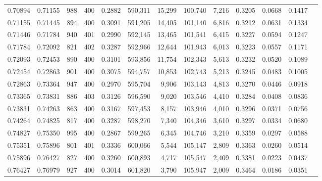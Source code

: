 \begin{tabular}{rrrrrrrrrrrrr}
0.70894 & 0.71155 &   988 & 400 &                                     0.2882 & 590,311 &  15,299 & 100,740 &   7,216 & 0.3205 & 0.0668 & 0.1417 \\
0.71155 & 0.71445 &   894 & 400 &                                     0.3091 & 591,205 &  14,405 & 101,140 &   6,816 & 0.3212 & 0.0631 & 0.1334 \\
0.71446 & 0.71784 &   940 & 401 &                                     0.2990 & 592,145 &  13,465 & 101,541 &   6,415 & 0.3227 & 0.0594 & 0.1247 \\
0.71784 & 0.72092 &   821 & 402 &                                     0.3287 & 592,966 &  12,644 & 101,943 &   6,013 & 0.3223 & 0.0557 & 0.1171 \\
0.72093 & 0.72453 &   890 & 400 &                                     0.3101 & 593,856 &  11,754 & 102,343 &   5,613 & 0.3232 & 0.0520 & 0.1089 \\
0.72454 & 0.72863 &   901 & 400 &                                     0.3075 & 594,757 &  10,853 & 102,743 &   5,213 & 0.3245 & 0.0483 & 0.1005 \\
0.72863 & 0.73364 &   947 & 400 &                                     0.2970 & 595,704 &   9,906 & 103,143 &   4,813 & 0.3270 & 0.0446 & 0.0918 \\
0.73365 & 0.73831 &   886 & 403 &                                     0.3126 & 596,590 &   9,020 & 103,546 &   4,410 & 0.3284 & 0.0408 & 0.0836 \\
0.73831 & 0.74263 &   863 & 400 &                                     0.3167 & 597,453 &   8,157 & 103,946 &   4,010 & 0.3296 & 0.0371 & 0.0756 \\
0.74264 & 0.74825 &   817 & 400 &                                     0.3287 & 598,270 &   7,340 & 104,346 &   3,610 & 0.3297 & 0.0334 & 0.0680 \\
0.74827 & 0.75350 &   995 & 400 &                                     0.2867 & 599,265 &   6,345 & 104,746 &   3,210 & 0.3359 & 0.0297 & 0.0588 \\
0.75351 & 0.75896 &   801 & 401 &                                     0.3336 & 600,066 &   5,544 & 105,147 &   2,809 & 0.3363 & 0.0260 & 0.0514 \\
0.75896 & 0.76427 &   827 & 400 &                                     0.3260 & 600,893 &   4,717 & 105,547 &   2,409 & 0.3381 & 0.0223 & 0.0437 \\
0.76427 & 0.76979 &   927 & 400 &                                     0.3014 & 601,820 &   3,790 & 105,947 &   2,009 & 0.3464 & 0.0186 & 0.0351 \\

\end{tabular}
